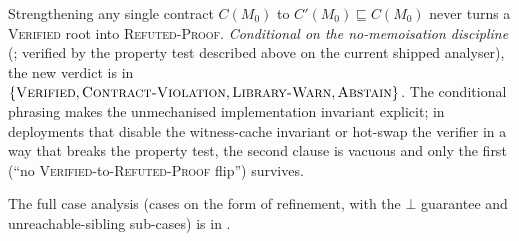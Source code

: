 \begin{theorem}\label{thm:monotonicity}
Strengthening any single contract $C(M_0)$ to $C'(M_0)\sqsubseteq
C(M_0)$ never turns a \textsc{Verified} root into
\textsc{Refuted-Proof}. \emph{Conditional on the no-memoisation
discipline} (; verified by the
property test described above on the current
shipped analyser), the new verdict is in
$\{\textsc{Verified},\textsc{Contract-Violation},
\textsc{Library-Warn},\textsc{Abstain}\}$. The conditional
phrasing makes the unmechanised implementation invariant
explicit; in deployments that disable the witness-cache
invariant or hot-swap the verifier in a way that breaks the
property test, the second clause is vacuous and only the first
(``no \textsc{Verified}-to-\textsc{Refuted-Proof} flip'')
survives.
\end{theorem}

The full case analysis (cases on the form of refinement, with
the $\bot$ guarantee and unreachable-sibling sub-cases) is in
.
